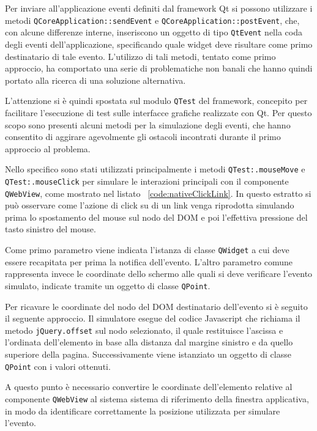 Per inviare all'applicazione eventi definiti dal framework Qt si possono utilizzare i metodi \verb|QCoreApplication::sendEvent| e \verb|QCoreApplication::postEvent|, che, con alcune differenze interne, inseriscono un oggetto di tipo \verb|QtEvent| nella coda degli eventi dell'applicazione, specificando quale widget deve risultare come primo destinatario di tale evento. L'utilizzo di tali metodi, tentato come primo approccio, ha comportato una serie di problematiche non banali che hanno quindi portato alla ricerca di una soluzione alternativa.

L'attenzione si è quindi spostata sul modulo \verb|QTest| del framework, concepito per facilitare l'esecuzione di test sulle interfacce grafiche realizzate con Qt. Per questo scopo sono presenti alcuni metodi per la simulazione degli eventi, che hanno consentito di aggirare agevolmente gli ostacoli incontrati durante il primo approccio al problema.

Nello specifico sono stati utilizzati principalmente i metodi \verb|QTest:.mouseMove| e \verb|QTest:.mouseClick| per simulare le interazioni principali con il componente \verb|QWebView|, come mostrato nel listato ~\ref{code:nativeClickLink}. In questo estratto si può osservare come l'azione di click su di un link venga riprodotta simulando prima lo spostamento del mouse sul nodo del DOM e poi l'effettiva pressione del tasto sinistro del mouse.



Come primo parametro viene indicata l'istanza di classe \verb|QWidget| a cui deve essere recapitata per prima la notifica dell'evento. L'altro parametro comune rappresenta invece le coordinate dello schermo alle quali si deve verificare l'evento simulato, indicate tramite un oggetto di classe \verb|QPoint|.

Per ricavare le coordinate del nodo del DOM destinatario dell'evento si è seguito il seguente approccio. Il simulatore esegue del codice Javascript che richiama il metodo \verb|jQuery.offset| sul nodo selezionato, il quale restituisce l'ascissa e l'ordinata dell'elemento in base alla distanza dal margine sinistro e da quello superiore della pagina. Successivamente viene istanziato un oggetto di classe \verb|QPoint| con i valori ottenuti. 

A questo punto è necessario convertire le coordinate dell'elemento relative al componente \verb|QWebView| al sistema sistema di riferimento della finestra applicativa, in modo da identificare correttamente la posizione utilizzata per simulare l'evento. 

